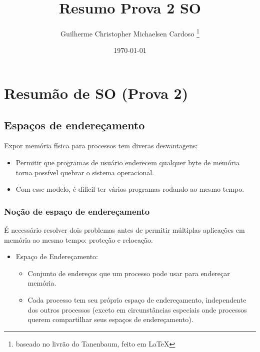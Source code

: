 \documentclass[10pt]{article}
\title{Resumo Prova 2 SO}
\author{Guilherme Christopher Michaelsen Cardoso
\thanks{baseado no livrão do Tanenbaum, feito em \LaTeX}}
\date{\today}
\begin{document}
\begin{titlepage}
    \maketitle
\end{titlepage}
\section{Resum\~ao de SO (Prova 2)} 
\subsection{Espa\c{c}os de endere\c{c}amento}
\large{Expor mem\'oria f\'isica para processos tem diveras desvantagens:}
\begin{itemize}
    \item Permitir que programas de usu\'ario enderecem qualquer byte de mem\'oria
        torna poss\'ivel quebrar o sistema operacional.
    \item Com esse modelo, \'e dificil ter v\'arios programas rodando ao mesmo tempo.
\end{itemize}
\subsubsection{No\c{c}\~ao de espa\c{c}o de endere\c{c}amento}
\'E necess\'ario resolver dois problemas antes de permitir m\'ultiplas aplica\c{c}\~oes em 
mem\'oria ao mesmo tempo: prote\c{c}\~ao e relocação.

\begin{itemize}
    \item Espaço de Endereçamento:
        \begin{itemize}
            \item Conjunto de endereços que um processo pode usar para endereçar memória.
            \item Cada processo tem seu próprio espaço de endereçamento, independente dos outros
                processos (exceto em circunstâncias especiais onde processos querem compartilhar
                seus espaços de endereçamento).
        \end{itemize}
\end{itemize}
\end{document}
